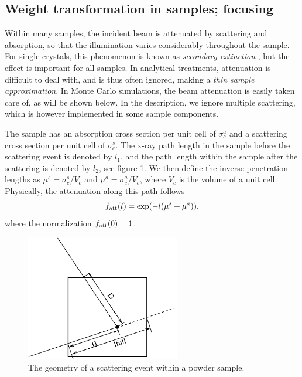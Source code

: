 \subsection{Weight transformation in samples; focusing}

Within many samples,
the incident beam is attenuated by scattering and absorption,
so that the illumination varies considerably throughout the sample.
For single crystals, this phenomenon is known as
{\em secondary extinction} \cite{bacon}, but the effect is
important for all samples.
In analytical treatments, attenuation is difficult to deal with,
and is thus often ignored, making a {\em thin sample approximation}.
In Monte Carlo simulations, the beam attenuation
is easily taken care of, as will be shown below.
In the description, we ignore multiple scattering, which is however
 implemented in some sample components.

The sample has an absorption cross section per unit cell of
$\sigma_c^a$ and a scattering cross section per unit cell
of $\sigma_c^s$. The x-ray path length
in the sample before the scattering event is denoted by $l_1$, and
the path length within the sample after the scattering
is denoted by $l_2$, see figure \ref{powderFig}.
We then define the inverse penetration lengths as
$\mu^s = \sigma_c^s / V_c$ and $\mu^a = \sigma_c^a / V_c$, where
$V_c$ is the volume of a unit cell. Physically, the attenuation
along this path follows
\begin{equation}
f_{\rm att}(l) = \exp(- l (\mu^s + \mu^a)) ,
\end{equation}
where the normalization $f_{\rm att}(0)=1$.

\begin{figure}
  \begin{center}
    \includegraphics[width=0.6\textwidth]{figures/scatter.eps}
  \end{center}
\caption{The geometry of a scattering event within a powder sample.}
\label{powderFig}
\end{figure}

